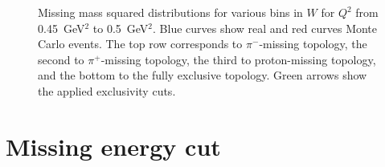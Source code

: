 \begin{figure}[htp]
\begin{center}
\caption{\small Missing mass squared distributions for various bins in $W$ for $Q^2$ from 0.45~GeV$^2$ to 0.5~GeV$^2$. Blue curves show real and red curves Monte Carlo events. The top row corresponds to $\pi^-$-missing topology, the second to $\pi^+$-missing topology, the third to proton-missing topology, and the bottom to the fully exclusive topology. Green arrows show the applied exclusivity cuts.  \label{fig:excl_miss_mass}}
\end{center}
\end{figure}

\section{Missing energy cut}
\label{miss_energ}

